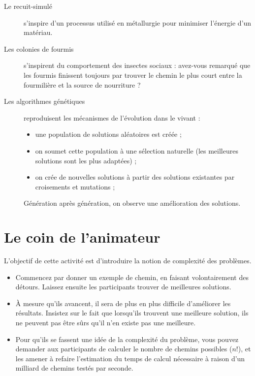 \begin{description}
\item[Le recuit-simulé] s'inspire d'un processus utilisé en métallurgie pour
  minimiser l'énergie d'un matériau.
\item[Les colonies de fourmis] s'inspirent du comportement des insectes sociaux
  : avez-vous remarqué que les fourmis finissent toujours par trouver le chemin
  le plus court entre la fourmilière et la source de nourriture ?
\item[Les algorithmes génétiques] reproduisent les mécanismes de l'évolution
  dans le vivant :
  \begin{itemize}
  \item une population de solutions aléatoires est créée ;
  \item on soumet cette population à une sélection naturelle (les meilleures
    solutions sont les plus adaptées) ;
  \item on crée de nouvelles solutions à partir des solutions existantes par
    croisements et mutations ;
  \end{itemize}
  Génération après génération, on observe une amélioration des solutions.
\end{description}

\section*{Le coin de l'animateur}

L'objectif de cette activité est d'introduire la notion de complexité des
problèmes.

\begin{itemize}
\item Commencez par donner un exemple de chemin, en faisant volontairement des
  détours. Laissez ensuite les participants trouver de meilleures solutions.
\item À mesure qu'ils avancent, il sera de plus en plus difficile d'améliorer
  les résultats. Insistez sur le fait que lorsqu'ils trouvent une meilleure
  solution, ils ne peuvent pas être sûrs qu'il n'en existe pas une meilleure.
\item Pour qu'ils se fassent une idée de la complexité du problème, vous pouvez
  demander aux participants de calculer le nombre de chemins possibles ($n!$),
  et les amener à refaire l'estimation du temps de calcul nécessaire à raison
  d'un milliard de chemins testés par seconde.
\end{itemize}

